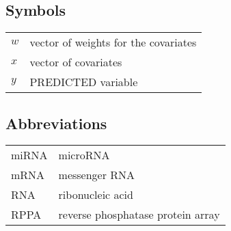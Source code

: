 \documentclass[english,12pt,a4paper,pdftex,elec,utf8]{aaltothesis}
\begin{document}

\subsection*{Symbols}

\begin{tabular}{ll}
$w$ & vector of weights for the covariates \\
$x$ & vector of covariates \\
$y$ & PREDICTED variable
\end{tabular}



\subsection*{Abbreviations}

\begin{tabular}{ll}
miRNA       & microRNA \\
mRNA        & messenger RNA \\
RNA         & ribonucleic acid \\
RPPA        & reverse phosphatase protein array
\end{tabular}
\end{document}
